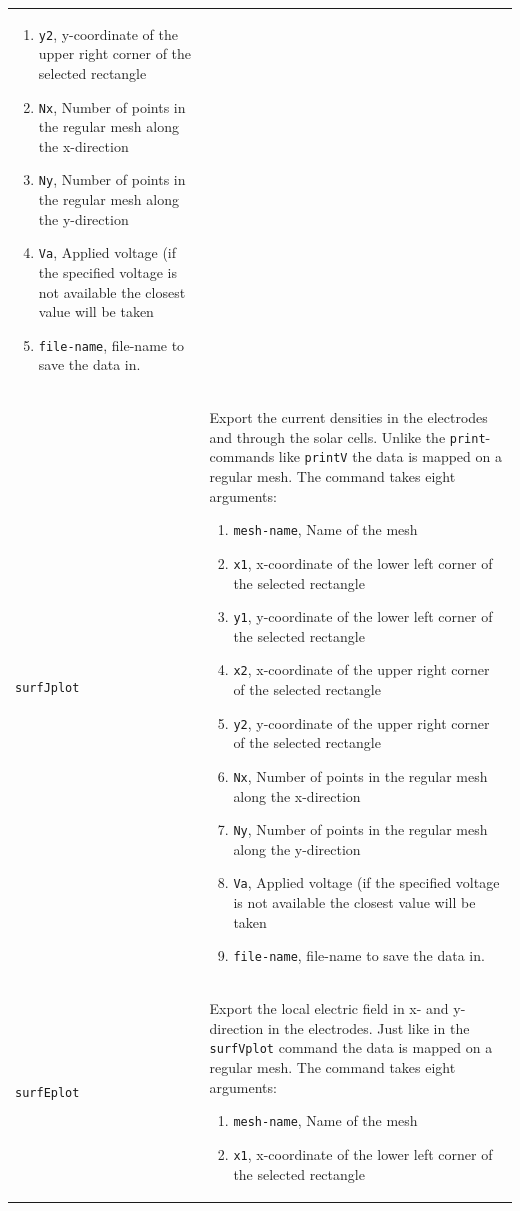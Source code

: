 \documentclass[noshowpacs,preprintnumbers,amsmath,amssymb, letter]{revtex4}
\begin{document}
\begin{longtable}{p{}p{}}
\begin{enumerate}
\item \texttt{y2}, y-coordinate of the upper right corner of the selected rectangle
\item \texttt{Nx}, Number of points in the regular mesh along the x-direction
\item \texttt{Ny}, Number of points in the regular mesh along the y-direction
\item \texttt{Va}, Applied voltage (if the specified voltage is not available the closest value will be taken
\item \texttt{file-name}, file-name to save the data in.
\end{enumerate}\\
\texttt{surfJplot}		& Export the current densities in the electrodes and through the solar cells. Unlike the \texttt{print}-commands like \texttt{printV} the data is mapped on a regular mesh. The command takes eight arguments:
\begin{enumerate}
\item \texttt{mesh-name}, Name of the mesh
\item \texttt{x1}, x-coordinate of the lower left corner of the selected rectangle
\item \texttt{y1}, y-coordinate of the lower left corner of the selected rectangle
\item \texttt{x2}, x-coordinate of the upper right corner of the selected rectangle
\item \texttt{y2}, y-coordinate of the upper right corner of the selected rectangle
\item \texttt{Nx}, Number of points in the regular mesh along the x-direction
\item \texttt{Ny}, Number of points in the regular mesh along the y-direction
\item \texttt{Va}, Applied voltage (if the specified voltage is not available the closest value will be taken
\item \texttt{file-name}, file-name to save the data in.
\end{enumerate}\\
\texttt{surfEplot}		& Export the local electric field in x- and y- direction in the electrodes. Just like in the \texttt{surfVplot} command the data is mapped on a regular mesh. The command takes eight arguments:
\begin{enumerate}
\item \texttt{mesh-name}, Name of the mesh
\item \texttt{x1}, x-coordinate of the lower left corner of the selected rectangle

\end{enumerate}
\end{longtable}
\end{document}
